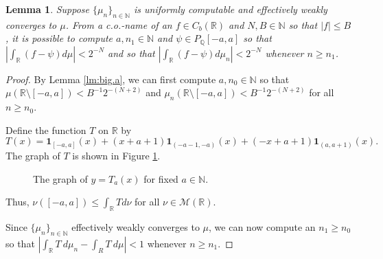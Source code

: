 \documentclass{amsart}
\newcommand{\Q}{\mathbb{Q}}
\newcommand{\R}{\mathbb{R}}
\newcommand{\N}{\mathbb{N}}
\newcommand{\M}{\mathcal{M}}
\newcommand{\one}{\mathbf{1}}
\newtheorem{lemma}[theorem]{Lemma}
\theoremstyle{definition}
\numberwithin{equation}{section}
\begin{document}
\begin{lemma}\label{lm:comp.psi}
Suppose $\{\mu_n\}_{n \in \N}$ is uniformly computable and effectively weakly converges to $\mu$.  From 
a c.o.-name of an $f \in C_b(\R)$ and $N,B \in \N$ so that $|f| \leq B$, it is possible to compute $a,n_1 \in \N$ and $\psi \in P_\Q[-a,a]$ so that $|\int_\R (f - \psi) d\mu| < 2^{-N}$ and so that $|\int_\R (f - \psi) d\mu_n| < 2^{-N}$ whenever $n \geq n_1$.
\end{lemma}

\begin{proof}
By Lemma \ref{lm:big.a}, we can first compute $a, n_0 \in \N$ so that $\mu(\R \setminus [-a,a]) < B^{-1}2^{-(N+2)}$ and 
$\mu_n(\R \setminus [-a,a]) < B^{-1}2^{-(N+2)}$ for all $n \geq n_0$.

Define the function $T$ on $\R$ by
\[
T(x)=\one_{[-a,a]}(x)+(x+a+1)\one_{(-a-1,-a)}(x)+(-x+a+1)\one_{(a,a+1)}(x).
\]
The graph of $T$ is shown in Figure \ref{fig:tent}.
\begin{figure}[h!]
    \centering
    \caption{The graph of $y=T_a(x)$ for fixed $a\in\N$. }
    \label{fig:tent}
\end{figure}
Thus, $\nu([-a,a]) \leq \int_\R T d\nu$ for all $\nu \in \M(\R)$.

Since $\{\mu_n\}_{n \in \N}$ effectively weakly converges to $\mu$, we can now compute an $n_1 \geq n_0$ so that 
$|\int_\R T\ d\mu_n - \int_R T\ d\mu| < 1$ whenever $n \geq n_1$.


\end{proof}
\end{document}
